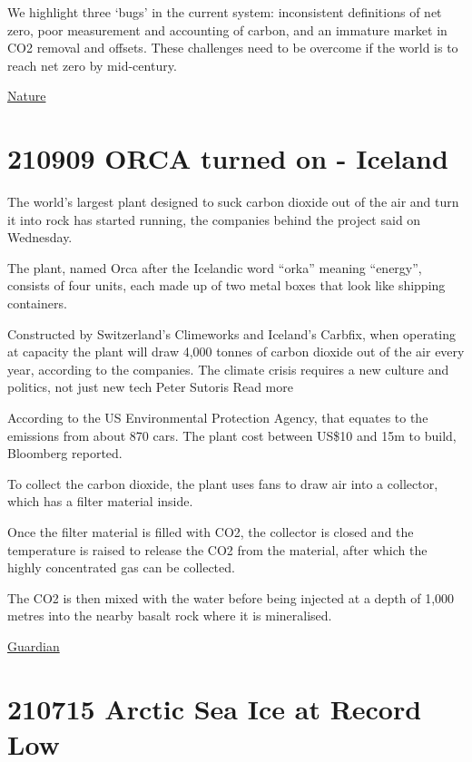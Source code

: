 \documentclass[
]{book}
\begin{document}
We highlight three `bugs' in the current system: inconsistent definitions of net zero, poor measurement and accounting of carbon, and an immature market in CO2 removal and offsets. These challenges need to be overcome if the world is to reach net zero by mid-century.

\href{https://www.nature.com/articles/d41586-021-02606-3}{Nature}

\hypertarget{orca-turned-on---iceland}{%
\section{210909 ORCA turned on - Iceland}\label{orca-turned-on---iceland}}

The world's largest plant designed to suck carbon dioxide out of the air and turn it into rock has started running, the companies behind the project said on Wednesday.

The plant, named Orca after the Icelandic word ``orka'' meaning ``energy'', consists of four units, each made up of two metal boxes that look like shipping containers.

Constructed by Switzerland's Climeworks and Iceland's Carbfix, when operating at capacity the plant will draw 4,000 tonnes of carbon dioxide out of the air every year, according to the companies.
The climate crisis requires a new culture and politics, not just new tech
Peter Sutoris
Read more

According to the US Environmental Protection Agency, that equates to the emissions from about 870 cars. The plant cost between US\$10 and 15m to build, Bloomberg reported.

To collect the carbon dioxide, the plant uses fans to draw air into a collector, which has a filter material inside.

Once the filter material is filled with CO2, the collector is closed and the temperature is raised to release the CO2 from the material, after which the highly concentrated gas can be collected.

The CO2 is then mixed with the water before being injected at a depth of 1,000 metres into the nearby basalt rock where it is mineralised.

\href{https://www.theguardian.com/environment/2021/sep/09/worlds-biggest-plant-to-turn-carbon-dioxide-into-rock-opens-in-iceland-orca}{Guardian}

\hypertarget{arctic-sea-ice-at-record-low}{%
\section{210715 Arctic Sea Ice at Record Low}\label{arctic-sea-ice-at-record-low}}
\end{document}
